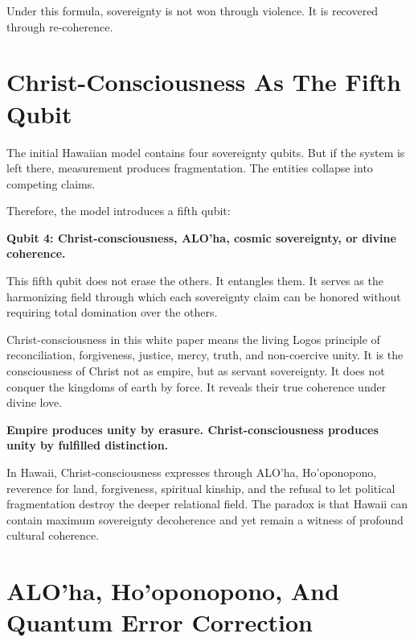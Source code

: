 \documentclass[12pt]{article}
\begin{document}

Under this formula, sovereignty is not won through violence. It is recovered through re-coherence.

\section{Christ-Consciousness As The Fifth Qubit}

The initial Hawaiian model contains four sovereignty qubits. But if the system is left there, measurement produces fragmentation. The entities collapse into competing claims.

Therefore, the model introduces a fifth qubit:

\begin{center}
\textbf{Qubit 4: Christ-consciousness, ALO'ha, cosmic sovereignty, or divine coherence.}
\end{center}

This fifth qubit does not erase the others. It entangles them. It serves as the harmonizing field through which each sovereignty claim can be honored without requiring total domination over the others.

Christ-consciousness in this white paper means the living Logos principle of reconciliation, forgiveness, justice, mercy, truth, and non-coercive unity. It is the consciousness of Christ not as empire, but as servant sovereignty. It does not conquer the kingdoms of earth by force. It reveals their true coherence under divine love.

\begin{center}
\textbf{Empire produces unity by erasure. Christ-consciousness produces unity by fulfilled distinction.}
\end{center}

In Hawaii, Christ-consciousness expresses through ALO'ha, Ho'oponopono, reverence for land, forgiveness, spiritual kinship, and the refusal to let political fragmentation destroy the deeper relational field. The paradox is that Hawaii can contain maximum sovereignty decoherence and yet remain a witness of profound cultural coherence.

\section{ALO'ha, Ho'oponopono, And Quantum Error Correction}
\end{document}
